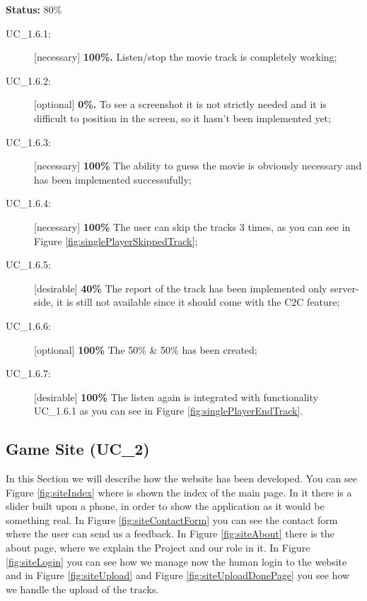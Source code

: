 	\textbf{Status:} 80\%
		\begin{description}
			\item[UC\_1.6.1:] [necessary] \textbf{100\%.}  Listen/stop the movie track is completely working;
			\item[UC\_1.6.2:] [optional] \textbf{0\%.} To see a screenshot it is not strictly needed and it is difficult to position in the screen, so it hasn't been implemented yet;
			\item[UC\_1.6.3:] [necessary] \textbf{100\%} The ability to guess the movie is obviously necessary and has been implemented successufully;
			\item[UC\_1.6.4:] [necessary] \textbf{100\%} The user can skip the tracks 3 times, as you can see in Figure \ref{fig:singlePlayerSkippedTrack};
			\item[UC\_1.6.5:] [desirable] \textbf{40\%} The report of the track has been implemented only server-side, it is still not available since it should come with the C2C feature;
			\item[UC\_1.6.6:] [optional] \textbf{100\%} The 50\% \& 50\% has been created;
			\item[UC\_1.6.7:] [desirable] \textbf{100\%} The listen again is integrated with functionality UC\_1.6.1 as you can see in Figure \ref{fig:singlePlayerEndTrack}.
		\end{description}

\subsection{Game Site (UC\_2)}
\label{sec:gameSiteActualSite}
In this Section we will describe how the website has been developed. You can see Figure \ref{fig:siteIndex} where is shown the index of the main page. In it there is a slider built upon a phone, in order to show the application as it would be something real. In Figure \ref{fig:siteContactForm} you can see the contact form where the user can send us a feedback. In Figure \ref{fig:siteAbout} there is the about page, where we explain the Project and our role in it. In Figure \ref{fig:siteLogin} you can see how we manage now the human login to the website and in Figure \ref{fig:siteUpload} and Figure \ref{fig:siteUploadDonePage} you see how we handle the upload of the tracks.

